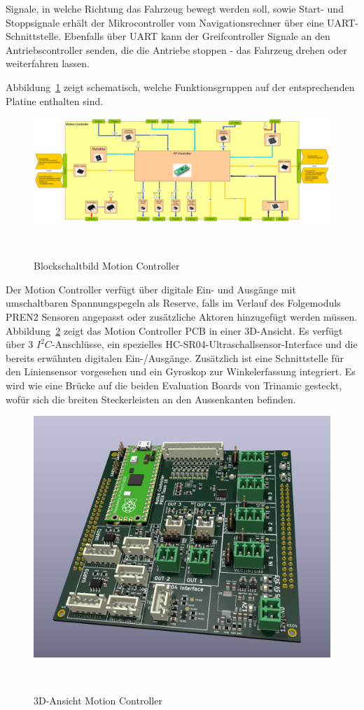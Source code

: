\documentclass[main.tex]{subfiles} %
\begin{document}
Signale, in welche Richtung das Fahrzeug bewegt werden soll, sowie Start- und
Stoppsignale erhält der Mikrocontroller vom Navigationsrechner über eine
UART-Schnittstelle. Ebenfalls über UART kann der Greifcontroller Signale an den
Antriebscontroller senden, die die Antriebe stoppen - das Fahrzeug drehen oder
weiterfahren lassen.

Abbildung~\ref{fig:Blockschaltbild_Motioncontroller} zeigt schematisch, welche
Funktionsgruppen auf der entsprechenden Platine enthalten sind.

\begin{figure}[H]
    \centering
    \includegraphics[width = 1\linewidth]{fig_Antriebe_und_Dimensionierung/MotionController_Blockschaltbild.pdf}
    \caption{Blockschaltbild Motion Controller}~\label{fig:Blockschaltbild_Motioncontroller}
\end{figure}

Der Motion Controller verfügt über digitale Ein- und Ausgänge mit umschaltbaren
Spannungspegeln als Reserve, falls im Verlauf des Folgemoduls PREN2 Sensoren
angepasst oder zusätzliche Aktoren hinzugefügt werden müssen.
Abbildung~\ref{fig:MotionBoard_PCB} zeigt das Motion Controller PCB in einer
3D-Ansicht. Es verfügt über 3 $I^2C$-Anschlüsse, ein spezielles
HC-SR04-Ultraschallsensor-Interface und die bereits erwähnten digitalen
Ein-/Ausgänge. Zusätzlich ist eine Schnittstelle für den Liniensensor
vorgesehen und ein Gyroskop zur Winkelerfassung integriert. Es wird wie eine
Brücke auf die beiden Evaluation Boards von Trinamic gesteckt, wofür sich die
breiten Steckerleisten an den Aussenkanten befinden.

\begin{figure}[H]
    \centering
    \includegraphics[width = 0.75\linewidth]{fig_Antriebe_und_Dimensionierung/MotionControllerPCB.jpg}
    \caption{3D-Ansicht Motion Controller}~\label{fig:MotionBoard_PCB}
\end{figure}
\end{document}
